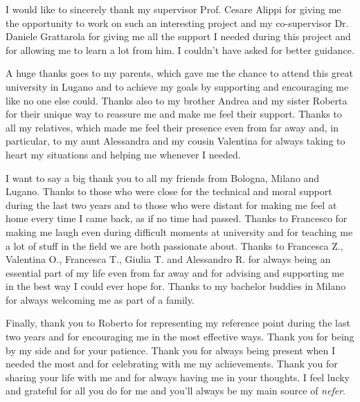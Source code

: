 
\begin{acknowledgements}
I would like to sincerely thank my supervisor Prof. Cesare Alippi for giving me the opportunity to work on such an interesting project and my co-supervisor Dr. Daniele Grattarola for giving me all the support I needed during this project and for allowing me to learn a lot from him. I couldn't have asked for better guidance.

A huge thanks goes to my parents, which gave me the chance to attend this great university in Lugano and to achieve my goals by supporting and encouraging me like no one else could. Thanks also to my brother Andrea and my sister Roberta for their unique way to reassure me and make me feel their support. Thanks to all my relatives, which made me feel their presence even from far away and, in particular, to my aunt Alessandra and my cousin Valentina for always taking to heart my situations and helping me whenever I needed.

I want to say a big thank you to all my friends from Bologna, Milano and Lugano. Thanks to those who were close for the technical and moral support during the last two years and to those who were distant for making me feel at home every time I came back, as if no time had passed. Thanks to Francesco for making me laugh even during difficult moments at university and for teaching me a lot of stuff in the field we are both passionate about. Thanks to Francesca Z., Valentina O., Francesca T., Giulia T. and Alessandro R. for always being an essential part of my life even from far away and for advising and supporting me in the best way I could ever hope for. Thanks to my bachelor buddies in Milano for always welcoming me as part of a family.

Finally, thank you to Roberto for representing my reference point during the last two years and for encouraging me in the most effective ways. Thank you for being by my side and for your patience. Thank you for always being present when I needed the most and for celebrating with me my achievements. Thank you for sharing your life with me and for always having me in your thoughts. I feel lucky and grateful for all you do for me and you'll always be my main source of \textit{nefer}.
\end{acknowledgements}